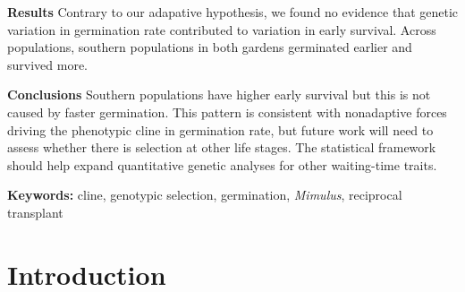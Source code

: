\documentclass[
  12pt,
]{article}
\begin{document}
\textbf{Results} Contrary to our adapative hypothesis, we found no evidence that genetic variation in germination rate contributed to variation in early survival. Across populations, southern populations in both gardens germinated earlier and survived more.

\textbf{Conclusions} Southern populations have higher early survival but this is not caused by faster germination. This pattern is consistent with nonadaptive forces driving the phenotypic cline in germination rate, but future work will need to assess whether there is selection at other life stages. The statistical framework should help expand quantitative genetic analyses for other waiting-time traits.

\textbf{Keywords:} cline, genotypic selection, germination, \emph{Mimulus}, reciprocal transplant

\newpage

\hypertarget{introduction}{%
\section{Introduction}\label{introduction}}
\end{document}
